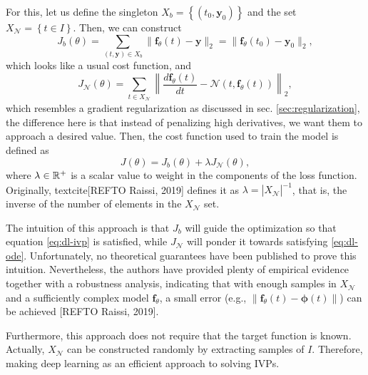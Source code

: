 For this, let us define the singleton $X_b=\left\{ \left( t_0,\bm{y}_0 \right)  \right\} $ and the set $X_{\mathcal{N}}=\left\{ t\in I \right\} $. Then, we can construct \[
    J_b\left( \theta \right) = \sum_{\left( t,\bm{y} \right) \in X_b } \|\bm{f}_\theta(t) - \bm{y}\|_2 = \|\bm{f}_\theta\left( t_0 \right) -\bm{y}_0\|_2
,\] which looks like a usual cost function, and \[
J_{\mathcal{N}}\left( \theta \right) = \sum_{t \in X_{\mathcal{N}}} \left\| \frac{d \bm{f}_\theta\left( t \right) }{dt} - \mathcal{N}\left( t,\bm{f}_\theta\left( t \right)  \right)  \right\|_2
,\] which resembles a gradient regularization as discussed in sec. \ref{sec:regularization}, the difference here is that instead of penalizing high derivatives, we want them to approach a desired value.
Then, the cost function used to train the model is defined as \[
J\left( \theta \right) = J_b\left( \theta \right) + \lambda J_{\mathcal{N}}\left( \theta \right) 
,\] where $\lambda \in \mathbb{R}^+$ is a scalar value to weight in the components of the loss function.
Originally, textcite[REFTO Raissi, 2019] defines it as $\lambda = |X_{\mathcal{N}}|^{-1}$, that is, the inverse of the number of elements in the $X_{\mathcal{N}}$ set\footnotemark.

The intuition of this approach is that $J_b$ will guide the optimization so that equation \eqref{eq:dl-ivp} is satisfied, while  $J_{\mathcal{N}}$ will ponder it towards satisfying \eqref{eq:dl-ode}.
Unfortunately, no theoretical guarantees have been published to prove this intuition.
Nevertheless, the authors have provided plenty of empirical evidence together with a robustness analysis, indicating that with enough samples in $X_{\mathcal{N}}$ and a sufficiently complex model $\bm{f}_\theta$, a small error (e.g., $\|\bm{f}_\theta\left( t \right)-\bm{\phi}\left( t \right) \| $) can be achieved [REFTO Raissi, 2019].

Furthermore, this approach does not require that the target function is known.
Actually, $X_{\mathcal{N}}$ can be constructed randomly by extracting samples of $I$.
Therefore, making deep learning as an efficient approach to solving \gls{IVP}s.

